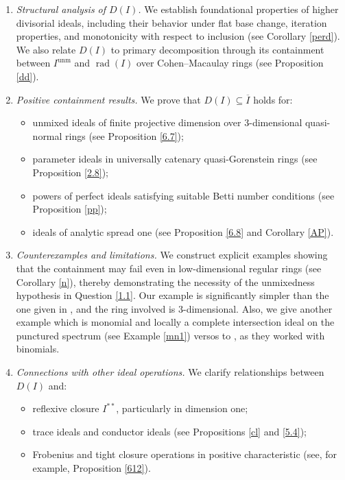\documentclass[11pt,a4paper]{amsart}
\numberwithin{equation}{section}
\DeclareMathOperator{\unm}{unm}
\DeclareMathOperator{\rad}{rad}
\begin{document}
\begin{enumerate}
	\item[(i)] \emph{Structural analysis of \(D(I)\).}  
	We establish foundational properties of higher divisorial ideals, including their behavior under flat base change, iteration properties, and monotonicity with respect to inclusion (see Corollary \ref{perd}). We also relate \(D(I)\) to primary decomposition through its containment between \(I^{\unm}\) and \(\rad(I)\) over Cohen–Macaulay rings (see Proposition \ref{dd}).
	
	\item[(ii)] \emph{Positive containment results.}  
	We prove that \(D(I) \subseteq \overline{I}\) holds for:
	\begin{itemize}
		\item[(a)] unmixed ideals of finite projective dimension over $3$-dimensional quasi-normal rings (see Proposition \ref{6.7});
		\item[(b)] parameter ideals in universally catenary quasi-Gorenstein rings (see Proposition \ref{2.8});
		\item[(c)] powers of perfect ideals satisfying suitable Betti number conditions (see Proposition \ref{pp});
		\item[(d)] ideals of analytic spread one (see Proposition \ref{6.8} and Corollary \ref{AP}).
	\end{itemize}
	
	\item[(iii)] \emph{Counterexamples and limitations.}  
	We construct explicit examples showing that the containment may fail even in low-dimensional regular rings (see Corollary \ref{n}), thereby demonstrating the necessity of the unmixedness hypothesis in Question \ref{1.1}. Our example is significantly simpler than the one given in \cite[\S 1]{corso}, and the ring involved is $3$-dimensional.
Also, we give another example  which is monomial and  locally a complete intersection ideal on the punctured 
spectrum 
(see Example \ref{mn1})
versos to \cite[\S 1]{corso}, as they worked with binomials.
	\item[(iv)] \emph{Connections with other ideal operations.}  
	We clarify relationships between \(D(I)\) and:
	\begin{itemize}
		\item[(a)] reflexive closure \(I^{**}\), particularly in dimension one;
		\item[(b)] trace ideals and conductor ideals (see Propositions \ref{cl} and \ref{5.4});
		\item[(c)] Frobenius and tight closure operations in positive characteristic (see, for example, Proposition \ref{612}).
	\end{itemize}
	

\end{enumerate}
\end{document}
